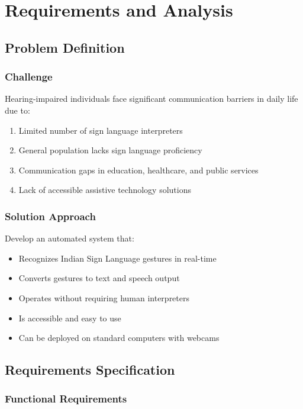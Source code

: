 \chapter{Requirements and Analysis}

\section{Problem Definition}

\subsection{Challenge}

Hearing-impaired individuals face significant communication barriers in daily life due to:
\begin{enumerate}
    \item Limited number of sign language interpreters
    \item General population lacks sign language proficiency
    \item Communication gaps in education, healthcare, and public services
    \item Lack of accessible assistive technology solutions
\end{enumerate}

\subsection{Solution Approach}

Develop an automated system that:
\begin{itemize}
    \item Recognizes Indian Sign Language gestures in real-time
    \item Converts gestures to text and speech output
    \item Operates without requiring human interpreters
    \item Is accessible and easy to use
    \item Can be deployed on standard computers with webcams
\end{itemize}

\section{Requirements Specification}

\subsection{Functional Requirements}

